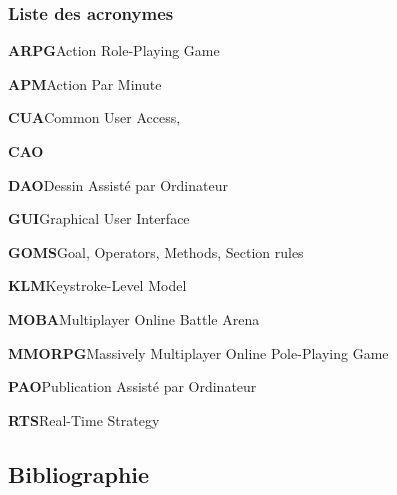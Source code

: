 \documentclass[a4paper,12pt]{article}
\begin{document}
\subsubsection{Liste des acronymes}
\label{sec:org3dfbd5a}
\begin{multicols}{2}\small{
\textbf{\hypertarget{gls-59}{ARPG}}\hspace*{1em}Action Role-Playing Game\hspace*{.5em}\pageref{gls-12-use-1}

\textbf{\hypertarget{gls-55}{APM}}\hspace*{1em}Action Par Minute\hspace*{.5em}\pageref{gls-10-use-1}

\textbf{\hypertarget{gls-111}{CUA}}\hspace*{1em}Common User Access\hspace*{.5em}\pageref{gls-1-use-1}, \pageref{gls-1-use-2}

\textbf{\hypertarget{gls-86}{CAO}}\hspace*{1em}\hspace*{.5em}\pageref{gls-5-use-1}

\textbf{\hypertarget{gls-113}{DAO}}\hspace*{1em}Dessin Assisté par Ordinateur\hspace*{.5em}\pageref{gls-6-use-1}

\textbf{\hypertarget{gls-178}{GUI}}\hspace*{1em}Graphical User Interface\hspace*{.5em}\pageref{gls-2-use-1}

\textbf{\hypertarget{gls-175}{GOMS}}\hspace*{1em}Goal, Operators, Methods, Section rules\hspace*{.5em}\pageref{gls-3-use-1}

\textbf{\hypertarget{gls-199}{KLM}}\hspace*{1em}Keystroke-Level Model\hspace*{.5em}\pageref{gls-4-use-1}

\textbf{\hypertarget{gls-227}{MOBA}}\hspace*{1em}Multiplayer Online Battle Arena\hspace*{.5em}\pageref{gls-11-use-1}

\textbf{\hypertarget{gls-223}{MMORPG}}\hspace*{1em}Massively Multiplayer Online Pole-Playing Game\hspace*{.5em}\pageref{gls-8-use-1}

\textbf{\hypertarget{gls-249}{PAO}}\hspace*{1em}Publication Assisté par Ordinateur\hspace*{.5em}\pageref{gls-7-use-1}

\textbf{\hypertarget{gls-296}{RTS}}\hspace*{1em}Real-Time Strategy\hspace*{.5em}\pageref{gls-9-use-1}

}\clearpage\end{multicols}
\subsection{Bibliographie}
\label{sec:org23327e8}
\begin{multicols}{2}\small{
\printbibliography[heading=none]
}\clearpage\end{multicols}
\end{document}
